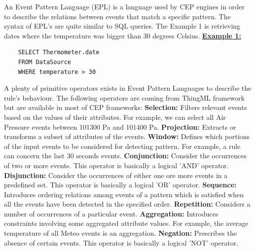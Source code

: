 \documentclass[11pt]{article}
\begin{document}
An Event Pattern Language (EPL) is a language used by CEP engines in order to describe the relations between events that match a specific pattern. The syntax of EPL's are quite similar to SQL queries. The Example 1 is retrieving dates where the temperature was bigger than 30 degrees Celsius.
\newline
\newline
\underline{\textbf{Example 1:}}
\begin{verbatim}
	SELECT Thermometer.date
	FROM DataSource
	WHERE temperature > 30
\end{verbatim}
A plenty of primitive operators exists in Event Pattern Languages to describe the rule's behaviour. The following operators are coming from ThingML framework but are available in most of CEP frameworks:
\newline
\newline
\textbf{Selection:} Filters relevant events based on the values of their attributes.\cite{lu} For example, we can select all Air Pressure events between 101300 Pa and 101400 Pa.
\newline
\textbf{Projection:} Extracts or transforms a subset of attributes of the events.\cite{lu}
\newline
\textbf{Window:} Defines which portions of the input events to be considered for detecting pattern.\cite{lu} For example, a rule can concern the last 30 seconds events.
\newline
\textbf{Conjunction:} Consider the occurrences of two or more events.\cite{lu} This operator is basically a logical 'AND' operator.
\newline
\textbf{Disjunction:} Consider the occurrences of either one ore more events in a predefined set.\cite{lu} This operator is basically a logical 'OR' operator.
\newline
\textbf{Sequence:} Introduces ordering relations among events of a pattern which is satisfied when all the events have been detected in the specified order.\cite{lu}
\newline
\textbf{Repetition:} Considers a number of occurrences of a particular event.\cite{lu}
\newline
\textbf{Aggregation:} Introduces constraints involving some aggregated attribute values.\cite{lu} For example, the average temperature of all Meteo events is an aggregation.
\newline
\textbf{Negation:} Prescribes the absence of certain events.\cite{lu} This operator is basically a logical 'NOT' operator.
\end{document}
